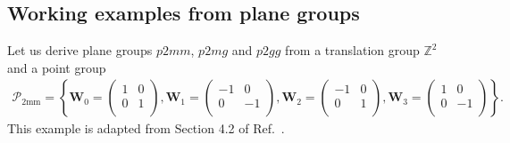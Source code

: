 \subsection{Working examples from plane groups}

Let us derive plane groups $p2mm$, $p2mg$ and $p2gg$ from a translation group $\mathbb{Z}^{2}$ and a point group
\begin{align*}
  \mathcal{P}_{\mathrm{2mm}} = \left\{
    \bm{W}_{0} = \begin{pmatrix}
      1 & 0 \\
      0 & 1 \\
    \end{pmatrix},
    \bm{W}_{1} = \begin{pmatrix}
      -1 & 0 \\
      0 & -1 \\
    \end{pmatrix},
    \bm{W}_{2} = \begin{pmatrix}
      -1 & 0 \\
      0 & 1 \\
    \end{pmatrix},
    \bm{W}_{3} = \begin{pmatrix}
      1 & 0 \\
      0 & -1 \\
    \end{pmatrix}
  \right\}.
\end{align*}
This example is adapted from Section 4.2 of Ref.~\cite{Souvignier08}.


